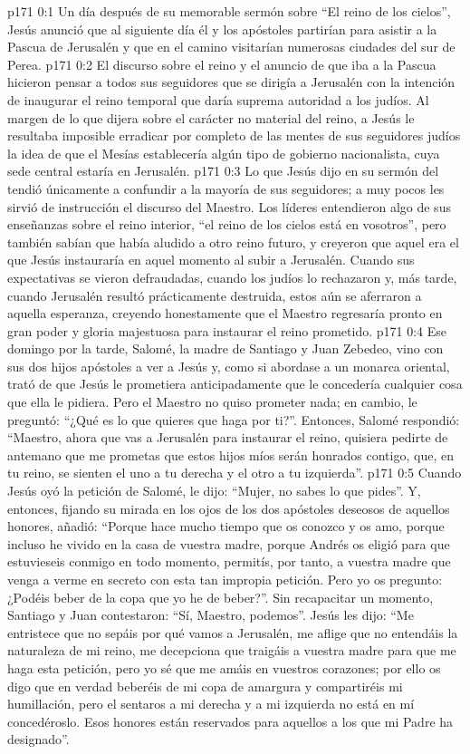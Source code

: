 \author{Comisión de seres intermedios}
\vs p171 0:1 Un día después de su memorable sermón sobre “El reino de los cielos”, Jesús anunció que al siguiente día él y los apóstoles partirían para asistir a la Pascua de Jerusalén y que en el camino visitarían numerosas ciudades del sur de Perea.
\vs p171 0:2 El discurso sobre el reino y el anuncio de que iba a la Pascua hicieron pensar a todos sus seguidores que se dirigía a Jerusalén con la intención de inaugurar el reino temporal que daría suprema autoridad a los judíos. Al margen de lo que dijera sobre el carácter no material del reino, a Jesús le resultaba imposible erradicar por completo de las mentes de sus seguidores judíos la idea de que el Mesías establecería algún tipo de gobierno nacionalista, cuya sede central estaría en Jerusalén.
\vs p171 0:3 Lo que Jesús dijo en su sermón del  tendió únicamente a confundir a la mayoría de sus seguidores; a muy pocos les sirvió de instrucción el discurso del Maestro. Los líderes entendieron algo de sus enseñanzas sobre el reino interior, “el reino de los cielos está en vosotros”, pero también sabían que había aludido a otro reino futuro, y creyeron que aquel era el que Jesús instauraría en aquel momento al subir a Jerusalén. Cuando sus expectativas se vieron defraudadas, cuando los judíos lo rechazaron y, más tarde, cuando Jerusalén resultó prácticamente destruida, estos aún se aferraron a aquella esperanza, creyendo honestamente que el Maestro regresaría pronto en gran poder y gloria majestuosa para instaurar el reino prometido.
\vs p171 0:4 \pc Ese domingo por la tarde, Salomé, la madre de Santiago y Juan Zebedeo, vino con sus dos hijos apóstoles a ver a Jesús y, como si abordase a un monarca oriental, trató de que Jesús le prometiera anticipadamente que le concedería cualquier cosa que ella le pidiera. Pero el Maestro no quiso prometer nada; en cambio, le preguntó: “¿Qué es lo que quieres que haga por ti?”. Entonces, Salomé respondió: “Maestro, ahora que vas a Jerusalén para instaurar el reino, quisiera pedirte de antemano que me prometas que estos hijos míos serán honrados contigo, que, en tu reino, se sienten el uno a tu derecha y el otro a tu izquierda”.
\vs p171 0:5 Cuando Jesús oyó la petición de Salomé, le dijo: “Mujer, no sabes lo que pides”. Y, entonces, fijando su mirada en los ojos de los dos apóstoles deseosos de aquellos honores, añadió: “Porque hace mucho tiempo que os conozco y os amo, porque incluso he vivido en la casa de vuestra madre, porque Andrés os eligió para que estuvieseis conmigo en todo momento, permitís, por tanto, a vuestra madre que venga a verme en secreto con esta tan impropia petición. Pero yo os pregunto: ¿Podéis beber de la copa que yo he de beber?”. Sin recapacitar un momento, Santiago y Juan contestaron: “Sí, Maestro, podemos”. Jesús les dijo: “Me entristece que no sepáis por qué vamos a Jerusalén, me aflige que no entendáis la naturaleza de mi reino, me decepciona que traigáis a vuestra madre para que me haga esta petición, pero yo sé que me amáis en vuestros corazones; por ello os digo que en verdad beberéis de mi copa de amargura y compartiréis mi humillación, pero el sentaros a mi derecha y a mi izquierda no está en mí concedéroslo. Esos honores están reservados para aquellos a los que mi Padre ha designado”.
